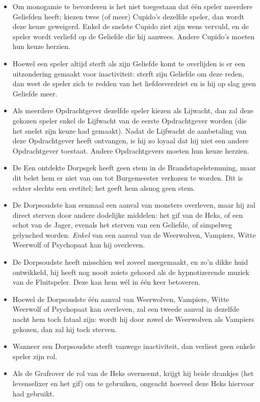 \documentclass[12pt]{article}
\begin{document}
    \begin{itemize}
  	\item Om monogamie te bevorderen is het niet toegestaan dat \'e\'en speler meerdere Geliefden heeft; kiezen twee (of meer) Cupido's dezelfde speler, dan wordt deze keuze geweigerd. Enkel de snelste Cupido ziet zijn wens vervuld, en de speler wordt verliefd op de Geliefde die hij aanwees. Andere Cupido's moeten hun keuze herzien.
  	\item Hoewel een speler altijd sterft als zijn Geliefde komt te overlijden is er een uitzondering gemaakt voor inactiviteit: sterft zijn Geliefde om deze reden, dan weet de speler zich te redden van het liefdesverdriet en is hij op slag geen Geliefde meer.
  	\item Als meerdere Opdrachtgever dezelfde speler kiezen als Lijwacht, dan zal deze gekozen speler enkel de Lijfwacht van de eerste Opdrachtgever worden (die het snelst zijn keuze had gemaakt). Nadat de Lijfwacht de aanbetaling van deze Opdrachtgever heeft ontvangen, is hij zo loyaal dat hij niet een andere Opdrachtgever toestaat. Andere Opdrachtgevers moeten hun keuze herzien.
  	\item De Een ontdekte Dorpsgek heeft geen stem in de Brandstapelstemming, maar dit belet hem er niet van om tot Burgemeester verkozen te worden. Dit is echter slechts een eretitel; het geeft hem alsnog geen stem.
  	\item De Dorpsoudste kan eenmaal een aanval van monsters overleven, maar hij zal direct sterven door andere dodelijke middelen: het gif van de Heks, of een schot van de Jager, evenals het sterven van een Geliefde, of simpelweg gelynched worden. \emph{Enkel} van een aanval van de Weerwolven, Vampiers, Witte Weerwolf of Psychopaat kan hij overleven.
  	\item De Dorpsoudste heeft misschien wel zoveel meegemaakt, en zo'n dikke huid ontwikkeld, hij heeft nog nooit zoiets gehoord als de hypnotizerende muziek van de Fluitspeler. Deze kan hem w\'el in \'e\'en keer betoveren.
  	\item Hoewel de Dorpsoudste \'e\'en aanval van Weerwolven, Vampiers, Witte Weerwolf of Psychopaat kan overleven, zal een tweede aanval in dezelfde nacht hem toch fataal zijn: wordt hij door zowel de Weerwolven als Vampiers gekozen, dan zal hij toch sterven.
  	\item Wanneer een Dorpsoudste sterft vanwege inactiviteit, dan verliest geen enkele speler zijn rol.
  	\item Als de Grafrover de rol van de Heks overneemt, krijgt hij beide drankjes (het levenselixer en het gif) om te gebruiken, ongeacht hoeveel deze Heks hiervoor had gebruikt.

\end{itemize}
\end{document}
